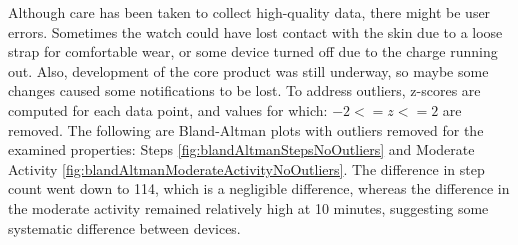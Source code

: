 Although care has been taken to collect high-quality data, there might be user errors. Sometimes the watch could have lost contact with the skin due to a loose strap for comfortable wear, or some device turned off due to the charge running out. Also, development of the core product was still underway, so maybe some changes caused some notifications to be lost. To address outliers, z-scores are computed for each data point, and values for which: $-2 <= z <= 2$ are removed. The following are Bland-Altman plots with outliers removed for the examined properties: Steps \ref{fig:blandAltmanStepsNoOutliers} and Moderate Activity \ref{fig:blandAltmanModerateActivityNoOutliers}. The difference in step count went down to 114, which is a negligible difference, whereas the difference in the moderate activity remained relatively high at 10 minutes, suggesting some systematic difference between devices.

